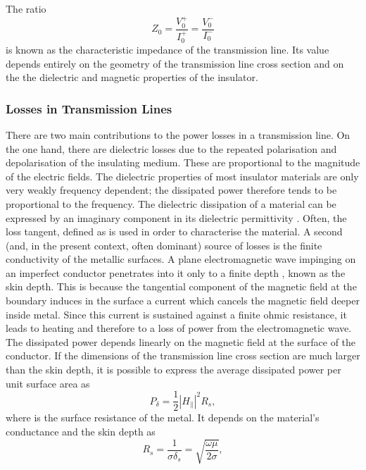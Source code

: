 The ratio
%
\begin{equation}
Z_0 = \frac{V_0^+}{I_0^+} = \frac{V_0^-}{I_0^-}
\end{equation}
%
is known as the characteristic impedance of the transmission line. Its
value depends entirely on the geometry of the transmission line cross
section and on the the dielectric and magnetic properties of the
insulator.



\subsubsection{Losses in Transmission
Lines}\label{losses-in-transmission-lines}

There are two main contributions to the power losses in a transmission
line. On the one hand, there are dielectric losses due to the repeated
polarisation and depolarisation of the insulating medium. These are
proportional to the magnitude of the electric fields. The dielectric
properties of most insulator materials are only very weakly frequency
dependent; the dissipated power therefore tends to be proportional to
the frequency. The dielectric dissipation of a material can be expressed
by an imaginary component in its dielectric permittivity
. Often, the loss tangent, defined
as  is used in order to characterise
the material. A second (and, in the present context, often
dominant) source of losses is the finite conductivity of the metallic surfaces.
A plane electromagnetic wave impinging on an imperfect
conductor penetrates into it only to a finite depth , known as
the skin depth. This is because the tangential component of the magnetic
field at the boundary induces in the surface a current which cancels the
magnetic field deeper inside metal. Since this current is sustained
against a finite ohmic resistance, it leads to heating and therefore to
a loss of power from the electromagnetic wave. The dissipated power
depends linearly on the magnetic field at the surface of the conductor.
If the dimensions of the transmission line cross section are much larger
than the skin depth, it is possible to express the average dissipated power per
unit surface area as
%
\begin{equation}
P_\delta = \frac{1}{2}|H_\parallel|^2 R_s,
\end{equation}
%
where  is the surface resistance of the metal. It depends on the
material's conductance and the skin depth as
%
\begin{equation}
R_s = \frac{1}{\sigma \delta_s} = \sqrt{\frac{\omega\mu}{2\sigma}},
\end{equation}
